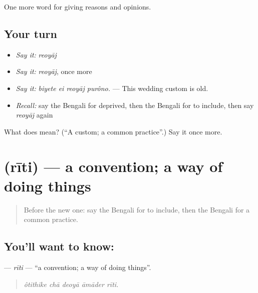 \begin{grammarlens}[title={What you've built}]
One more word for giving reasons and opinions.
\end{grammarlens}

\subsection*{Your turn}
\begin{itemize}
\raggedright
  \item \emph{Say it:} \emph{reoyāj}
  \item \emph{Say it:} \emph{reoyāj}, once more
  \item \emph{Say it:} \emph{biyete ei reoyāj purôno.} — This wedding custom is old.
  \item \emph{Recall:} say the Bengali for deprived, then the Bengali for to include, then say \emph{reoyāj} again
\end{itemize}

\begin{tcolorbox}[breakable,colback=teal!4,colframe=teal!35!black,title={Before you move on}]
What does  mean? (\textquotedblleft{}A custom; a common practice\textquotedblright{}.) Say it once more.
\end{tcolorbox}
\section[\texorpdfstring{\bn{রীতি} (rīti)}{রীতি (rīti)}]{ (rīti) — a convention; a way of doing things}

\label{lesson:BN-C353-riti}



\begin{quote}
Before the new one: say the Bengali for to include, then the Bengali for a common practice.
\end{quote}

\subsection*{You'll want to know: }
\textbf{} — \emph{rīti} — \textquotedblleft{}a convention; a way of doing things\textquotedblright{}.

\begin{quote}
    
\end{quote}

\begin{quote}
\emph{ôtithike chā deoyā āmāder rīti.}
\end{quote}

